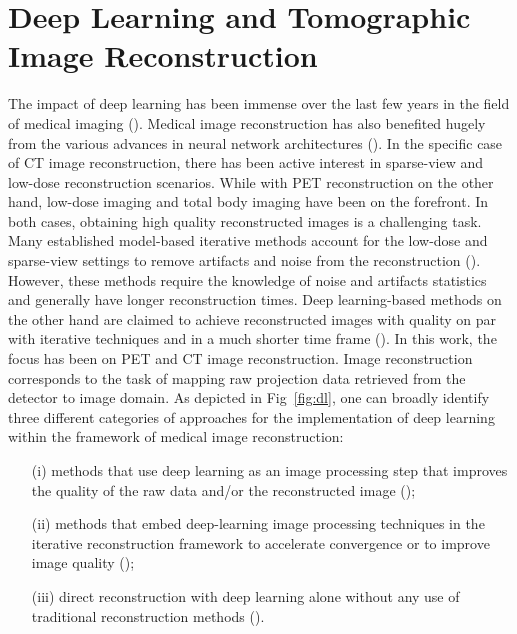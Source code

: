 
\chapter{Deep Learning and Tomographic Image Reconstruction} %

\label{Chapter3} %

The impact of deep learning has been immense over the last few years in the field of medical imaging (\cite{litjens2017survey, greenspan2016guest}). Medical image reconstruction has also benefited hugely from the various advances in neural network architectures (\cite{wang2020deep,yedder2021deep,reader2020deep}). In the specific case of \ac{CT} image reconstruction, there has been active interest in sparse-view and low-dose reconstruction scenarios. While with \ac{PET} reconstruction on the other hand, low-dose imaging and total body imaging have been on the forefront. In both cases, obtaining high quality reconstructed images is a challenging task. Many established model-based iterative methods account for the low-dose and sparse-view settings to remove artifacts and noise from the reconstruction (\cite{nuyts1998iterative,Elbakri2002,liu2013total}). However, these methods require the knowledge of noise and artifacts statistics and generally have longer reconstruction times. Deep learning-based methods on the other hand are claimed to achieve reconstructed images with quality on par with iterative techniques and in a much shorter time frame (\cite{leuschner2021quantitative}). In this work, the focus has been on \ac{PET} and \ac{CT} image reconstruction. 
Image reconstruction corresponds to the task of mapping raw projection data retrieved from the detector to image domain. As depicted in Fig~\ref{fig:dl}, one can broadly identify three different categories of approaches for the implementation of deep learning within the framework of medical image reconstruction:
\begin{itemize}
	\item[(i)] methods that use deep learning as an image processing step that improves the quality of the raw data and/or the reconstructed image (\cite{gong2018pet, maier2018deep}); 
	\item[(ii)] methods that embed deep-learning image processing techniques in the iterative reconstruction framework to accelerate convergence or to improve image quality (\cite{xie2019generative,kim2018penalized,gong2019iterative});
	\item[(iii)] direct reconstruction with deep learning alone without any use of traditional reconstruction methods  (\cite{whiteley2019direct,zhu2018image,haeggstroem2018deeprec}).
\end{itemize}


